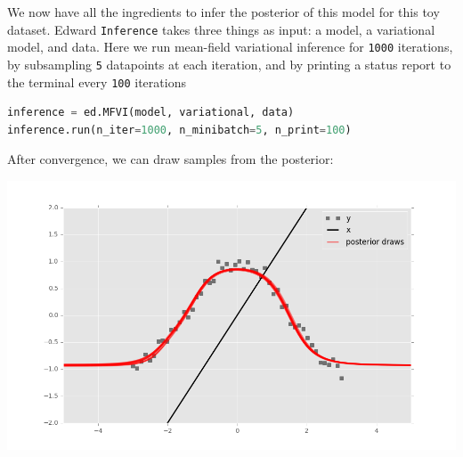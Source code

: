 We now have all the ingredients to infer the posterior of this model for this
toy dataset. Edward \texttt{Inference} takes three things as input: a model, a
variational model, and data. Here we run mean-field variational inference
for \texttt{1000} iterations, by subsampling \texttt{5} datapoints at each
iteration, and by printing a status report to the terminal every \texttt{100}
iterations
\begin{lstlisting}[language=Python]
inference = ed.MFVI(model, variational, data)
inference.run(n_iter=1000, n_minibatch=5, n_print=100)  
\end{lstlisting}

After convergence, we can draw samples from the posterior:

\includegraphics[width=700px]{images/getting-started-fig2.png}
